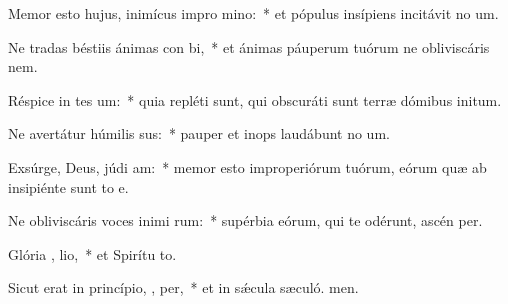 \item Memor esto hujus, inimícus impro mino:~* et pópulus insípiens incitávit no um.
\item Ne tradas béstiis ánimas con bi,~* et ánimas páuperum tuórum ne obliviscáris  nem.
\item Réspice in tes um:~* quia repléti sunt, qui obscuráti sunt terræ dómibus initum.
\item Ne avertátur húmilis  sus:~* pauper et inops laudábunt no um.
\item Exsúrge, Deus, júdi  am:~* memor esto improperiórum tuórum, eórum quæ ab insipiénte sunt to e.
\item Ne obliviscáris voces inimi rum:~* supérbia eórum, qui te odérunt, ascén per.
\item Glória ,  lio,~* et Spirítu to.
\item Sicut erat in princípio,  ,  per,~* et in sǽcula sæculó. men.
